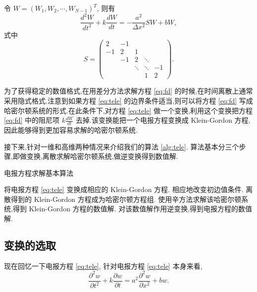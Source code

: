 令 $W=(W_1,W_2,\cdots,W_{N-1})^T$, 则有
\begin{equation}\label{eq:fd}
\frac{d^2 W}{d t^2}+k\frac{d W}{d t}= -\frac{a^2}{\Delta x^2}SW + b W,
\end{equation}
式中
\begin{equation}\label{eq:s}
S=\begin{pmatrix}
2&-1&&&\\
-1&2&1&&\\
&-1&2&\ddots&\\
&&\ddots&\ddots&-1\\
&&&1&2
\end{pmatrix}.
\end{equation}

为了获得稳定的数值格式,在用差分方法求解方程 \eqref{eq:fd} 的时候,在时间离散上通常采用隐式格式.注意到如果方程 \eqref{eq:tele} 的边界条件适当,则可以将方程 \eqref{eq:fd} 写成哈密尔顿系统的形式.在此条件下,对方程 \eqref{eq:tele} 做一个变换,利用这个变换把方程 \eqref{eq:fd} 中的阻尼项 $k\frac{d W}{d t}$ 去掉.该变换能把一个电报方程变换成 Klein-Gordon 方程,因此能够得到更加容易求解的哈密尔顿系统.

接下来,针对一维和高维两种情况来介绍我们的算法 \ref{alg:tele}. 算法基本分三个步骤,即做变换,离散求解哈密尔顿系统,做逆变换得到数值解.

\begin{algorithm}
\caption{电报方程求解基本算法}
\begin{algorithmic}[1]
\STATE 将电报方程 \eqref{eq:tele} 变换成相应的 Klein-Gordon 方程. 相应地改变初边值条件. \newline
\STATE 离散得到的 Klein-Gordon 方程成为哈密尔顿方程组. 使用辛方法求解该哈密尔顿系统,得到 Klein-Gordon 方程的数值解. \newline
\STATE 对该数值解作用逆变换,得到电报方程的数值解.
\end{algorithmic}
\label{alg:tele}
\end{algorithm}

\subsection{变换的选取}\label{sec:02transform}
现在回忆一下电报方程 \eqref{eq:tele}, 针对电报方程 \eqref{eq:tele} 本身来看,
\begin{equation}\label{eq:telegraph}
\frac{\partial ^2 w}{\partial t^2}+k\frac{\partial w}{\partial t}=a^2 \frac{\partial ^2 w}{\partial x^2} + b w.
\end{equation}

